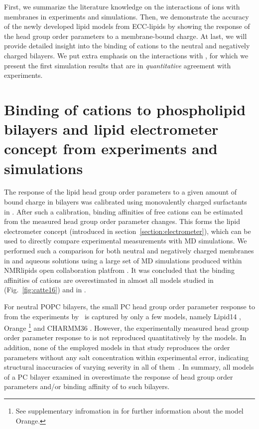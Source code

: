 First, we summarize the literature knowledge on the interactions of ions with membranes in experiments and simulations.
Then, we demonstrate the accuracy of the newly developed lipid models from ECC-lipids
by showing the response of the head group order parameters to a membrane-bound charge.
At last, we will provide detailed insight into the binding of cations to the neutral and negatively charged bilayers. 
We put extra emphasis on the interactions with , 
for which we present the first simulation results that are in \emph{quantitative} agreement with experiments. \citep{altenbach84, catte16, nmrlipids_proj4, melcr18}






\section{Binding of cations to phospholipid bilayers and lipid electrometer concept from experiments and simulations}
\label{section:electrometer_exp_sim} 

The response of the lipid head group order parameters 
to a given amount of bound charge in bilayers 
was calibrated using monovalently charged surfactants in \citep{scherer89, akutsu81, altenbach84}. 
After such a calibration,
binding affinities of free cations can be estimated from the measured head group order parameter changes. \citep{scherer89}
This forms the lipid electrometer concept (introduced in section~\ref{section:electrometer}),
which can be used to directly compare experimental measurements with MD simulations. 
We performed such a comparison for both neutral and negatively charged membranes 
in  and  aqueous solutions using a large set of MD simulations 
produced within NMRlipids open collaboration platfrom \citep{nmrlipids}. 
It was concluded  that the binding affinities of cations 
are overestimated in almost all models 
studied in \citep{catte16} (Fig.~\ref{fig:catte16}) 
and in \citep{nmrlipids_proj4}. 

For neutral POPC bilayers, 
the small PC head group order parameter response to  from the experiments by~\citet{seelig87} is captured by only a few models, 
namely Lipid14 \citep{dickson14}, 
Orange \footnote{See supplementary infromation in \citep{catte16} for further information about the model Orange.} 
and CHARMM36 \citep{klauda10}. 
However, the experimentally measured head group order parameter response to  is not reproduced quantitatively by the models. \citep{catte16}
In addition, none of the employed models in that study reproduces the order parameters without any salt concentration
within experimental error, indicating structural inaccuracies of varying severity in all of them~\citep{botan15}.
In summary, all models of a PC bilayer examined in \citep{catte16} 
overestimate the response of head group order parameters and/or binding affinity of  to such bilayers. 



